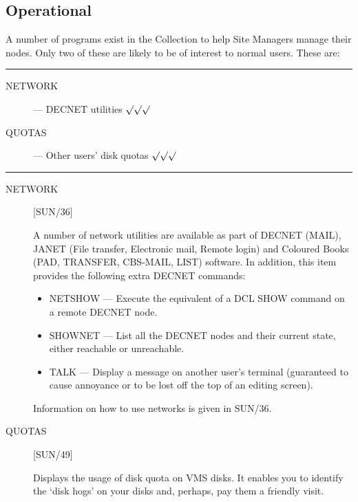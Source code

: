 \newpage

\subsection{Operational}

A number of programs exist in the Collection to help Site Managers manage their
nodes.
Only two of these are likely to be of interest to normal users.
These are:

\rule{\textwidth}{0.5mm}
\begin{description}
\begin{description}
\item [NETWORK] --- DECNET utilities \hfill $\surd\surd\surd$
\item [QUOTAS] --- Other users' disk quotas \hfill $\surd\surd\surd$
\end{description}
\end{description}
\rule{\textwidth}{0.5mm}

\begin{description}

\item [NETWORK] \hfill [SUN/36]

A number of network utilities are available as part of DECNET (MAIL), JANET
(File transfer, Electronic mail, Remote login) and Coloured Books (PAD,
TRANSFER, CBS-MAIL, LIST) software.
In addition, this item provides the following extra DECNET commands:
\begin{itemize}
\item NETSHOW
--- Execute the equivalent of a DCL SHOW command on a remote DECNET node.
\item SHOWNET
--- List all the DECNET nodes and their current state, either reachable or
unreachable.
\item TALK
--- Display a message on another user's terminal (guaranteed to cause
 annoyance or to be lost off the top of an editing screen).
\end{itemize}
Information on how to use networks is given in SUN/36.

\item [QUOTAS] \hfill [SUN/49]

Displays the usage of disk quota on VMS disks.
It enables you to identify the `disk hogs' on your disks and, perhaps, pay them
a friendly visit.

\end{description}

\newpage

